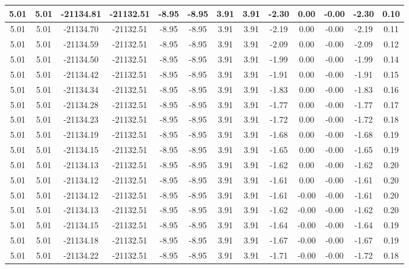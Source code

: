 \begin{table}[htbp]
\begin{adjustbox}{angle=90}
\begin{tabular}{|c|c|c|c|c|c|c|c|c|c|c|c|c|}
 5.01 & 5.01 & -21134.81 & -21132.51 & -8.95 & -8.95 & 3.91 & 3.91 & -2.30 & 0.00 & -0.00 & -2.30 & 0.10\\ \hline
 5.01 & 5.01 & -21134.70 & -21132.51 & -8.95 & -8.95 & 3.91 & 3.91 & -2.19 & 0.00 & -0.00 & -2.19 & 0.11\\ \hline
 5.01 & 5.01 & -21134.59 & -21132.51 & -8.95 & -8.95 & 3.91 & 3.91 & -2.09 & 0.00 & -0.00 & -2.09 & 0.12\\ \hline
 5.01 & 5.01 & -21134.50 & -21132.51 & -8.95 & -8.95 & 3.91 & 3.91 & -1.99 & 0.00 & -0.00 & -1.99 & 0.14\\ \hline
 5.01 & 5.01 & -21134.42 & -21132.51 & -8.95 & -8.95 & 3.91 & 3.91 & -1.91 & 0.00 & -0.00 & -1.91 & 0.15\\ \hline
 5.01 & 5.01 & -21134.34 & -21132.51 & -8.95 & -8.95 & 3.91 & 3.91 & -1.83 & 0.00 & -0.00 & -1.83 & 0.16\\ \hline
 5.01 & 5.01 & -21134.28 & -21132.51 & -8.95 & -8.95 & 3.91 & 3.91 & -1.77 & 0.00 & -0.00 & -1.77 & 0.17\\ \hline
 5.01 & 5.01 & -21134.23 & -21132.51 & -8.95 & -8.95 & 3.91 & 3.91 & -1.72 & 0.00 & -0.00 & -1.72 & 0.18\\ \hline
 5.01 & 5.01 & -21134.19 & -21132.51 & -8.95 & -8.95 & 3.91 & 3.91 & -1.68 & 0.00 & -0.00 & -1.68 & 0.19\\ \hline
 5.01 & 5.01 & -21134.15 & -21132.51 & -8.95 & -8.95 & 3.91 & 3.91 & -1.65 & 0.00 & -0.00 & -1.65 & 0.19\\ \hline
 5.01 & 5.01 & -21134.13 & -21132.51 & -8.95 & -8.95 & 3.91 & 3.91 & -1.62 & 0.00 & -0.00 & -1.62 & 0.20\\ \hline
 5.01 & 5.01 & -21134.12 & -21132.51 & -8.95 & -8.95 & 3.91 & 3.91 & -1.61 & 0.00 & -0.00 & -1.61 & 0.20\\ \hline
 5.01 & 5.01 & -21134.12 & -21132.51 & -8.95 & -8.95 & 3.91 & 3.91 & -1.61 & -0.00 & -0.00 & -1.61 & 0.20\\ \hline
 5.01 & 5.01 & -21134.13 & -21132.51 & -8.95 & -8.95 & 3.91 & 3.91 & -1.62 & -0.00 & -0.00 & -1.62 & 0.20\\ \hline
 5.01 & 5.01 & -21134.15 & -21132.51 & -8.95 & -8.95 & 3.91 & 3.91 & -1.64 & -0.00 & -0.00 & -1.64 & 0.19\\ \hline
 5.01 & 5.01 & -21134.18 & -21132.51 & -8.95 & -8.95 & 3.91 & 3.91 & -1.67 & -0.00 & -0.00 & -1.67 & 0.19\\ \hline
 5.01 & 5.01 & -21134.22 & -21132.51 & -8.95 & -8.95 & 3.91 & 3.91 & -1.71 & -0.00 & -0.00 & -1.72 & 0.18\\ \hline

\end{tabular}
\end{adjustbox}
\end{table}
